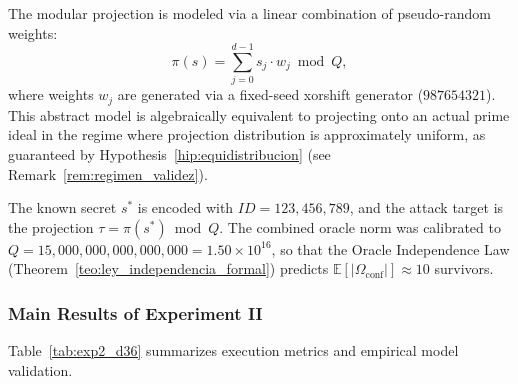 \documentclass[11pt,a4paper]{article}
\theoremstyle{plain}
\theoremstyle{definition}
\numberwithin{equation}{section}
\newcommand{\E}{\mathbb{E}}
\begin{document}
The modular projection is modeled via a linear combination of pseudo-random weights:
\begin{equation}
\pi(s) = \sum_{j=0}^{d-1} s_j \cdot w_j \bmod Q,
\end{equation}
where weights $w_j$ are generated via a fixed-seed xorshift generator ($987654321$). This abstract model is algebraically equivalent to projecting onto an actual prime ideal in the regime where projection distribution is approximately uniform, as guaranteed by Hypothesis~\ref{hip:equidistribucion} (see Remark~\ref{rem:regimen_validez}).

The known secret $s^*$ is encoded with $ID = 123{,}456{,}789$, and the attack target is the projection $\tau = \pi(s^*) \bmod Q$. The combined oracle norm was calibrated to $Q = 15{,}000{,}000{,}000{,}000{,}000 = 1.50 \times 10^{16}$, so that the Oracle Independence Law (Theorem~\ref{teo:ley_independencia_formal}) predicts $\E[|\Omega_{\text{conf}}|] \approx 10$ survivors.

\subsubsection{Main Results of Experiment II}

Table~\ref{tab:exp2_d36} summarizes execution metrics and empirical model validation.
\end{document}
